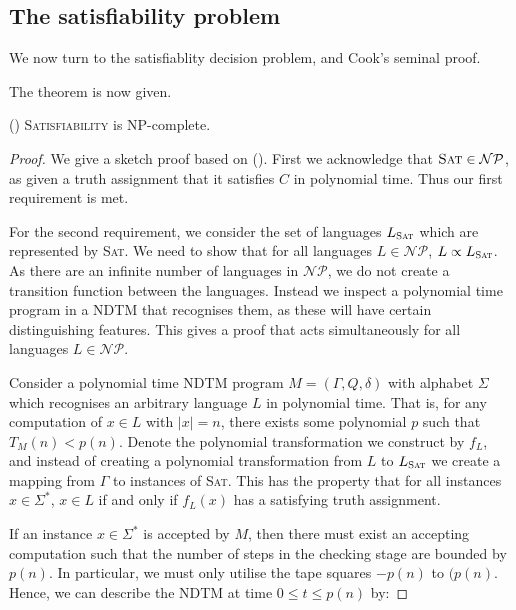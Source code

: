 \subsection{The satisfiability problem}
We now turn to the satisfiablity decision problem, and Cook's seminal proof.



The theorem is now given.

\begin{theorem}
    (\cite{CookStephenA.1971CoPM}) \textsc{Satisfiability} is NP-complete.
\end{theorem}

\begin{proof}
    We give a sketch proof based on (\cite{GareyMichaelR1979Cai:}). First we acknowledge that $\text{\textsc{Sat}} \in \mathcal{NP}$, as given a truth assignment that it satisfies $C$ in polynomial time. Thus our first requirement is met.

    For the second requirement, we consider the set of languages $L_{\textsc{Sat}}$ which are represented by \textsc{Sat}. We need to show that for all languages $L \in \mathcal{NP}$, $L \propto L_{\text{\textsc{Sat}}}$. As there are an infinite number of languages in $\mathcal{NP}$, we do not create a transition function between the languages. Instead we inspect a polynomial time program in a NDTM that recognises them, as these will have certain distinguishing features. This gives a proof that acts simultaneously for all languages $L \in \mathcal{NP}$.

    Consider a polynomial time NDTM program $M = (\Gamma,Q,\delta)$ with alphabet $\Sigma$ which recognises an arbitrary language $L$ in polynomial time. That is, for any computation of $x \in L$ with $|x| = n$, there exists some polynomial $p$ such that $T_M(n) < p(n)$. Denote the polynomial transformation we construct by $f_L$, and instead of creating a polynomial transformation from $L$ to $L_{\text{\textsc{Sat}}}$ we create a mapping from $\Gamma$ to instances of \textsc{Sat}. This has the property that for all instances $x \in \Sigma^*$, $x \in L$ if and only if $f_L(x)$ has a satisfying truth assignment.

    If an instance $x \in \Sigma^*$ is accepted by $M$, then there must exist an accepting computation such that the number of steps in the checking stage are bounded by $p(n)$. In particular, we must only utilise the tape squares $-p(n)$ to $(p(n)$. Hence, we can describe the NDTM at time $0 \leq t \leq p(n)$ by:


\end{proof}
